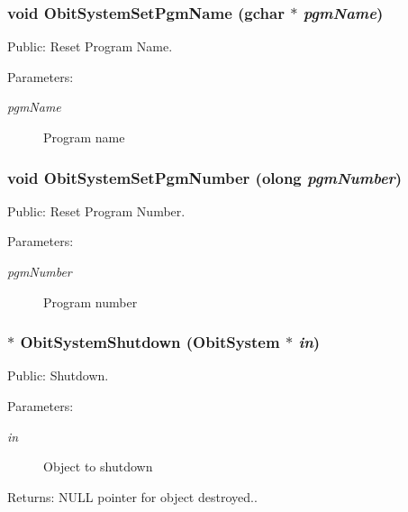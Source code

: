 \subsubsection{\setlength{\rightskip}{0pt plus 5cm}void Obit\-System\-Set\-Pgm\-Name (gchar $\ast$ {\em pgm\-Name})}\label{ObitSystem_8c_a22}


Public: Reset Program Name. 

\begin{Desc}
\item[Parameters:]
\begin{description}
\item[{\em pgm\-Name}]Program name \end{description}
\end{Desc}
\subsubsection{\setlength{\rightskip}{0pt plus 5cm}void Obit\-System\-Set\-Pgm\-Number ({\bf olong} {\em pgm\-Number})}\label{ObitSystem_8c_a24}


Public: Reset Program Number. 

\begin{Desc}
\item[Parameters:]
\begin{description}
\item[{\em pgm\-Number}]Program number \end{description}
\end{Desc}
\subsubsection{$\ast$ Obit\-System\-Shutdown ({\bf Obit\-System} $\ast$ {\em in})}\label{ObitSystem_8c_a16}


Public: Shutdown. 

\begin{Desc}
\item[Parameters:]
\begin{description}
\item[{\em in}]Object to shutdown \end{description}
\end{Desc}
\begin{Desc}
\item[Returns:]NULL pointer for object destroyed.. \end{Desc}
